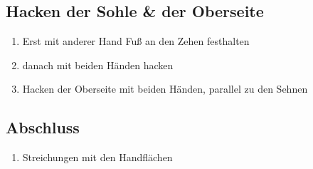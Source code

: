 \subsection{Hacken der Sohle \& der Oberseite}
\begin{enumerate}
\item Erst mit anderer Hand Fuß an den Zehen festhalten
\item danach mit beiden Händen hacken
\item Hacken der Oberseite mit beiden Händen, parallel zu den Sehnen
\end{enumerate}

\subsection{Abschluss}
\begin{enumerate}
\item Streichungen mit den Handflächen
\end{enumerate}
